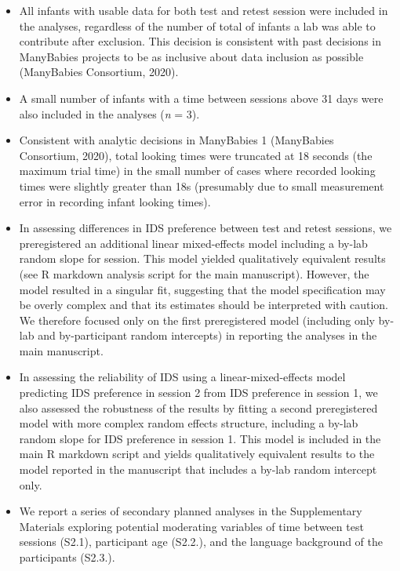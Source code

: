 \documentclass[
  man, donotrepeattitle,floatsintext]{apa6}
\providecommand{\tightlist}{%
  \setlength{\itemsep}{0pt}\setlength{\parskip}{0pt}}
\begin{document}
\begin{itemize}
\tightlist
\item
  All infants with usable data for both test and retest session were included in the analyses, regardless of the number of total of infants a lab was able to contribute after exclusion. This decision is consistent with past decisions in ManyBabies projects to be as inclusive about data inclusion as possible (ManyBabies Consortium, 2020).
\item
  A small number of infants with a time between sessions above 31 days were also included in the analyses (\emph{n} = 3).
\item
  Consistent with analytic decisions in ManyBabies 1 (ManyBabies Consortium, 2020), total looking times were truncated at 18 seconds (the maximum trial time) in the small number of cases where recorded looking times were slightly greater than 18s (presumably due to small measurement error in recording infant looking times).
\item
  In assessing differences in IDS preference between test and retest sessions, we preregistered an additional linear mixed-effects model including a by-lab random slope for session. This model yielded qualitatively equivalent results (see R markdown analysis script for the main manuscript). However, the model resulted in a singular fit, suggesting that the model specification may be overly complex and that its estimates should be interpreted with caution. We therefore focused only on the first preregistered model (including only by-lab and by-participant random intercepts) in reporting the analyses in the main manuscript.
\item
  In assessing the reliability of IDS using a linear-mixed-effects model predicting IDS preference in session 2 from IDS preference in session 1, we also assessed the robustness of the results by fitting a second preregistered model with more complex random effects structure, including a by-lab random slope for IDS preference in session 1. This model is included in the main R markdown script and yields qualitatively equivalent results to the model reported in the manuscript that includes a by-lab random intercept only.
\item
  We report a series of secondary planned analyses in the Supplementary Materials exploring potential moderating variables of time between test sessions (S2.1), participant age (S2.2.), and the language background of the participants (S2.3.).
\end{itemize}
\end{document}
